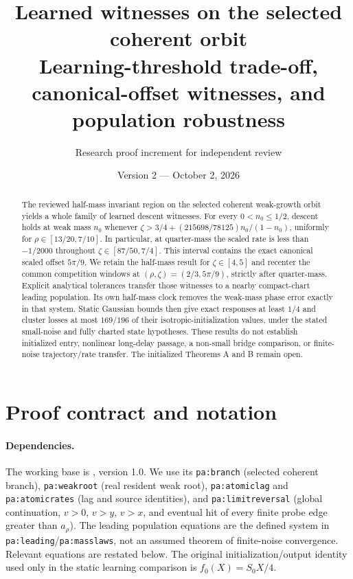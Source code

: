 \documentclass[11pt]{article}
\title{Learned witnesses on the selected coherent orbit\\
\large Learning-threshold trade-off, canonical-offset witnesses, and population robustness}
\author{Research proof increment for independent review}
\date{Version 2 --- October 2, 2026}
\numberwithin{equation}{section}
\theoremstyle{remark}\newtheorem{remark}[theorem]{Remark}
\newcommand{\1}{\mathbf 1}
\begin{document}
\maketitle
\begin{abstract}
The reviewed half-mass invariant region on the selected coherent weak-growth
orbit yields a whole family of learned descent witnesses. For every
$0<n_0\le1/2$, descent holds at weak mass $n_0$ whenever
$\zeta>3/4+(215698/78125)n_0/(1-n_0)$, uniformly for
$\rho\in[13/20,7/10]$. In particular, at quarter-mass the scaled rate is
less than $-1/2000$ throughout $\zeta\in[87/50,7/4]$.
This interval contains the exact canonical scaled offset $5\pi/9$.
We retain the half-mass result for $\zeta\in[4,5]$ and recenter the common
competition windows at $(\rho,\zeta)=(2/3,5\pi/9)$, strictly after
quarter-mass. Explicit analytical tolerances transfer those witnesses to a
nearby compact-chart leading population. Its own half-mass clock removes
the weak-mass phase error exactly in that system. Static Gaussian bounds
then give exact responses at least $1/4$ and cluster losses at most
$169/196$ of their isotropic-initialization values, under the stated
small-noise and fully charted state hypotheses.
These results do not establish initialized entry, nonlinear long-delay
passage, a non-small bridge comparison, or finite-noise trajectory/rate
transfer. The initialized Theorems A and B remain open.
\end{abstract}

\section{Proof contract and notation}\label{inc:AN06:v2:contract}
\paragraph{Dependencies.}
The working base is , version 1.0.
We use its \texttt{pa:branch} (selected coherent branch),
\texttt{pa:weakroot} (real resident weak root),
\texttt{pa:atomiclag} and \texttt{pa:atomicrates} (lag and source identities),
and \texttt{pa:limitreversal} (global continuation, $v>0$, $v>y$, $v>x$,
and eventual hit of every finite probe edge greater than $a_\rho$).
The leading population equations are the defined system in
\texttt{pa:leading}/\texttt{pa:masslaws}, not an assumed theorem of
finite-noise convergence. Relevant equations are restated below.
The original initialization/output identity used only in the static learning
comparison is $f_0(X)=S_0X/4$.
\end{document}
